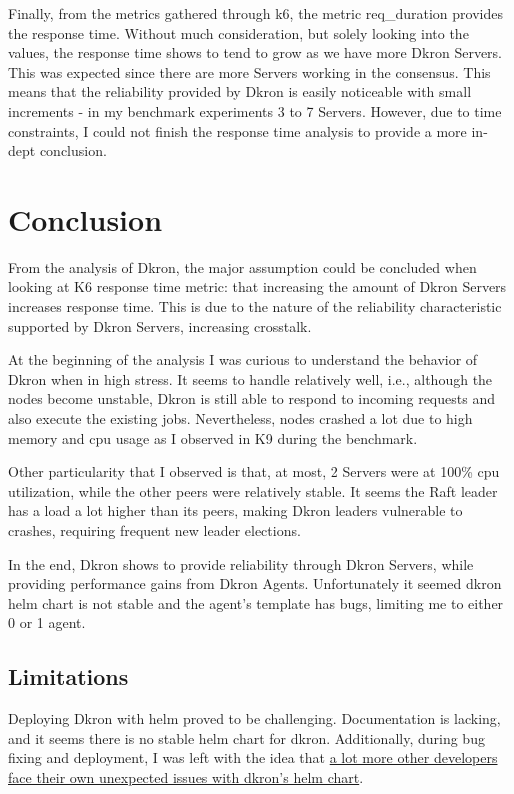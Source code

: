 \documentclass[runningheads]{llncs}
\begin{document}
Finally, from the metrics gathered through k6, the metric req\_duration provides the response
time. Without much consideration, but solely looking into the values, the response time shows to
tend to grow as we have more Dkron Servers. This was expected since there are more Servers working
in the consensus. This means that the reliability provided by Dkron is easily noticeable with small
increments - in my benchmark experiments 3 to 7 Servers. However, due to time constraints, I
could not finish the response time analysis to provide a more in-dept conclusion.

\section{Conclusion}
\label{conclusion}

From the analysis of Dkron, the major assumption could be concluded when looking at K6 response time
metric: that increasing the amount of Dkron Servers increases response time. This is due
to the nature of the reliability characteristic supported by Dkron Servers, increasing crosstalk.

At the beginning of the analysis I was curious to understand the behavior of Dkron when
in high stress. It seems to handle relatively well, i.e., although the nodes become unstable,
Dkron is still able to respond to incoming requests and also execute the existing jobs. Nevertheless,
nodes crashed a lot due to high memory and cpu usage as I observed in K9 during the benchmark.

Other particularity that I observed is that, at most, 2 Servers were at 100\% cpu utilization, while
the other peers were relatively stable. It seems the Raft leader has a load a lot higher than its
peers, making Dkron leaders vulnerable to crashes, requiring frequent new leader elections.

In the end, Dkron shows to provide reliability through Dkron Servers, while providing performance gains
from Dkron Agents. Unfortunately it seemed dkron helm chart is not stable and the agent's template has bugs,
limiting me to either 0 or 1 agent.


\subsection{Limitations}
Deploying Dkron with helm proved to be challenging. Documentation is lacking, and
it seems there is no stable helm chart for dkron. Additionally, during bug fixing and deployment,
I was left with the idea that \href{https://github.com/distribworks/dkron/issues?q=helm}{a lot more other developers face their own
unexpected issues with dkron's helm chart}.
\end{document}
